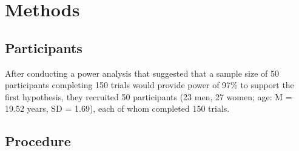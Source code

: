\documentclass[
  man]{apa6}
\begin{document}
\hypertarget{methods}{%
\section{Methods}\label{methods}}

\hypertarget{participants}{%
\subsection{Participants}\label{participants}}

After conducting a power analysis that suggested that a sample size of 50 participants completing 150 trials would provide power of 97\% to support the first hypothesis, they recruited 50 participants (23 men, 27 women; age: M = 19.52 years, SD = 1.69), each of whom completed 150 trials.

\hypertarget{procedure}{%
\subsection{Procedure}\label{procedure}}
\end{document}
